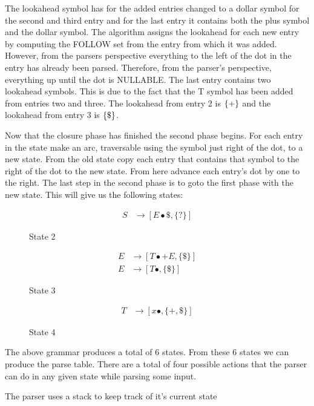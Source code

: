 The lookahead symbol has for the added entries changed to a dollar symbol for the second and third entry and for the last entry it contains both the plus symbol and the dollar symbol. The algorithm assigns the lookahead for each new entry by computing the FOLLOW set from the entry from which it was added. However, from the parsers perspective everything to the left of the dot in the entry has already been parsed. Therefore, from the parser's perspective, everything up until the dot is NULLABLE. The last entry contains two lookahead symbols. This is due to the fact that the T symbol has been added from entries two and three. The lookahead from entry 2 is $\left\{+\right\}$ and the lookahead from entry 3 is $\left\{\$\right\}$. 

Now that the closure phase has finished the second phase begins. For each entry in the state make an arc, traversable using the symbol just right of the dot, to a new state. From the old state copy each entry that contains that symbol to the right of the dot to the new state. From here advance each entry's dot by one to the right. The last step in the second phase is to goto the first phase with the new state. This will give us the following states:

\begin{figure}[htp!]
    \[
      \begin{split}
          S &\rightarrow [E\bullet \$, \{\text{?}\}]
      \end{split}
    \]
    \caption*{State 2}
\end{figure}
\begin{figure}[htp!]
    \[
      \begin{split}
          E &\rightarrow [T\bullet + E, \{\$\}]\\
          E &\rightarrow [T\bullet, \{\$\}]
      \end{split}
    \]
    \caption*{State 3}
\end{figure}
\begin{figure}[htp!]
    \[
      \begin{split}
          T &\rightarrow [x\bullet, \{+,\$\}]
      \end{split}
    \]
  \caption*{State 4}
\end{figure}

The above grammar produces a total of 6 states. From these 6 states we can produce the parse table. There are a total of four possible actions that the parser can do in any given state while parsing some input. 

The parser uses a stack to keep track of it's current state

